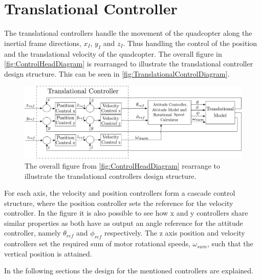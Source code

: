 \section{Translational Controller} \label{sec:TranslationalController}

The translational controllers handle the movement of the quadcopter along the inertial frame directions, $x_I$, $y_I$ and $z_I$. Thus handling the control of the position and the translational velocity of the quadcopter. The overall figure in \autoref{fig:ControlHeadDiagram} is rearranged to illustrate the translational controller design structure. This can be seen in \autoref{fig:TranslationalControlDiagram}.
%
\begin{figure}[H]
	\centering
	\includegraphics[scale=0.25]{figures/TranslationalControlDiagram}
	\caption{The overall figure from \autoref{fig:ControlHeadDiagram} rearrange to illustrate the translational controllers design structure.}
	\label{fig:TranslationalControlDiagram}
\end{figure}
%
For each axis, the velocity and position controllers form a cascade control structure, where the position controller sets the reference for the velocity controller. In the figure it is also possible to see how x and y controllers share similar properties as both have as output an angle reference for the attitude controller, namely $\theta_{ref}$ and $\phi_{ref}$ respectively. 
The z axis position and velocity controllers set the required sum of motor rotational speeds, $\omega_{sum}$, such that the vertical position is attained.

In the following sections the design for the mentioned controllers are explained.